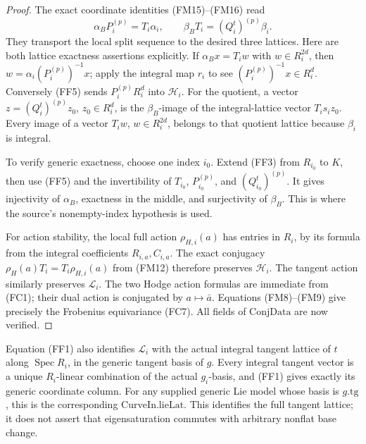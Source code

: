 \begin{proof}
The exact coordinate identities (FM15)--(FM16) read
\[
                  \alpha_B P_i^{(p)}=T_i\alpha_i,\qquad
                \beta_BT_i=(Q_i^t)^{(p)}\beta_i.
 \tag{FF5}\label{eq:faithful-family-conjugate-transport}
\]
They transport the local split sequence to the desired
three lattices.
Here are both lattice exactness assertions explicitly.
If \(\alpha_Bx=T_iw\) with \(w\in R_i^{2d}\),
then \(w=\alpha_i(P_i^{(p)})^{-1}x\);
apply the integral map \(r_i\) to see
\((P_i^{(p)})^{-1}x\in R_i^d\).
Conversely (FF5) sends \(P_i^{(p)}R_i^d\) into
\(\mathcal H_i\).
For the quotient, a vector
\(z=(Q_i^t)^{(p)}z_0\), \(z_0\in R_i^d\), is the
\(\beta_B\)-image of the integral-lattice vector
\(T_i s_i z_0\).
Every image of a vector \(T_iw\), \(w\in R_i^{2d}\),
belongs to that quotient lattice because \(\beta_i\)
is integral.

To verify generic exactness, choose one index \(i_0\).
Extend (FF3) from \(R_{i_0}\) to \(K\), then use
(FF5) and the invertibility of \(T_{i_0}\),
\(P_{i_0}^{(p)}\), and \((Q_{i_0}^t)^{(p)}\).
It gives injectivity of \(\alpha_B\), exactness in the
middle, and surjectivity of \(\beta_B\).
This is where the source's nonempty-index hypothesis
is used.

For action stability, the local full action
\(\rho_{H,i}(a)\) has entries in \(R_i\), by its formula
from the integral coefficients \(R_{i,a},C_{i,a}\).
The exact conjugacy
\(\rho_H(a)T_i=T_i\rho_{H,i}(a)\) from (FM12)
therefore preserves \(\mathcal H_i\).
The tangent action similarly preserves \(\mathcal L_i\).
The two Hodge action formulas are immediate from
(FC1); their dual action is conjugated by \(a\mapsto\bar a\).
Equations (FM8)--(FM9) give precisely the Frobenius
equivariance (FC7).
All fields of \(\mathrm{ConjData}\) are now verified.
\end{proof}

Equation (FF1) also identifies \(\mathcal L_i\) with the
actual integral tangent lattice of \(t\) along
\(\operatorname{Spec}R_i\), in the generic tangent basis
of \(g\).
Every integral tangent vector is a unique \(R_i\)-linear
combination of the actual \(g_i\)-basis, and (FF1)
gives exactly its generic coordinate column.
For any supplied generic Lie model whose basis is
\(g.\mathrm{tg}\), this is the corresponding
\(\mathrm{CurveIn.lieLat}\).
This identifies the full tangent lattice; it does not
assert that eigensaturation commutes with arbitrary
nonflat base change.

